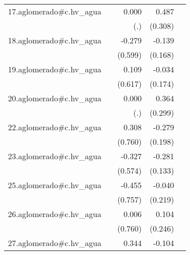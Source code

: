 {\begin{longtable}{l*{4}{D{.}{.}{-1}}}
\addlinespace
17.aglomerado#c.hv\_agua&                     &       0.000         &       0.487         &                     \\
            &                     &         (.)         &     (0.308)         &                     \\
\addlinespace
18.aglomerado#c.hv\_agua&                     &      -0.279         &      -0.139         &                     \\
            &                     &     (0.599)         &     (0.168)         &                     \\
\addlinespace
19.aglomerado#c.hv\_agua&                     &       0.109         &      -0.034         &                     \\
            &                     &     (0.617)         &     (0.174)         &                     \\
\addlinespace
20.aglomerado#c.hv\_agua&                     &       0.000         &       0.364         &                     \\
            &                     &         (.)         &     (0.299)         &                     \\
\addlinespace
22.aglomerado#c.hv\_agua&                     &       0.308         &      -0.279         &                     \\
            &                     &     (0.760)         &     (0.198)         &                     \\
\addlinespace
23.aglomerado#c.hv\_agua&                     &      -0.327         &      -0.281\sym{*}  &                     \\
            &                     &     (0.574)         &     (0.133)         &                     \\
\addlinespace
25.aglomerado#c.hv\_agua&                     &      -0.455         &      -0.040         &                     \\
            &                     &     (0.757)         &     (0.219)         &                     \\
\addlinespace
26.aglomerado#c.hv\_agua&                     &       0.006         &       0.104         &                     \\
            &                     &     (0.760)         &     (0.246)         &                     \\
\addlinespace
27.aglomerado#c.hv\_agua&                     &       0.344         &      -0.104         &                     \\

\end{longtable}}
